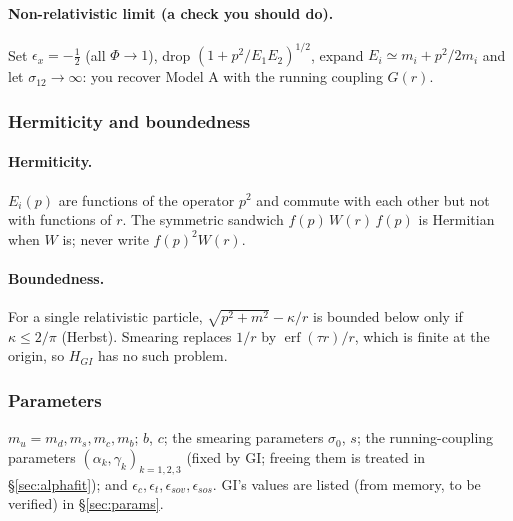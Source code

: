 \documentclass[11pt,a4paper]{article}
\numberwithin{equation}{section}
\theoremstyle{definition}
\theoremstyle{plain}
\theoremstyle{remark}
\numberwithin{algorithm}{section}
\newcommand{\erf}{\operatorname{erf}}
\begin{document}
\paragraph{Non-relativistic limit (a check you should do).} Set $\epsilon_x=-\frac12$ (all $\Phi\to1$), drop $(1+p^2/E_1E_2)^{1/2}$, expand $E_i\simeq m_i+p^2/2m_i$ and let $\sigma_{12}\to\infty$: you recover Model A with the running coupling $G(r)$.

\subsubsection{Hermiticity and boundedness}
\paragraph{Hermiticity.} $E_i(p)$ are functions of the operator $p^2$ and commute with each other but not with functions of $r$. The symmetric sandwich $f(p)\,W(r)\,f(p)$ is Hermitian when $W$ is; never write $f(p)^2W(r)$.

\paragraph{Boundedness.} For a single relativistic particle, $\sqrt{p^2+m^2}-\kappa/r$ is bounded below only if $\kappa\le2/\pi$ (Herbst). Smearing replaces $1/r$ by $\erf(\tau r)/r$, which is finite at the origin, so $H_{GI}$ has no such problem.

\subsubsection{Parameters}
$m_u=m_d,m_s,m_c,m_b$; $b$, $c$; the smearing parameters $\sigma_0$, $s$; the running-coupling parameters $(\alpha_k,\gamma_k)_{k=1,2,3}$ (fixed by GI; freeing them is treated in \S\ref{sec:alphafit}); and $\epsilon_c,\epsilon_t,\epsilon_{sov},\epsilon_{sos}$. GI's values are listed (from memory, to be verified) in \S\ref{sec:params}.

\end{document}
